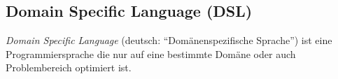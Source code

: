 \subsection{Domain Specific Language (DSL)}
\label{sec:dsl}

\emph{Domain Specific Language} (deutsch: \enquote{Domänenspezifische Sprache}) ist eine Programmiersprache die nur auf eine bestimmte Domäne oder auch Problembereich optimiert ist.